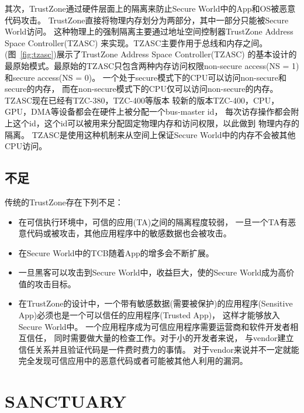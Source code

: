 其次，TrustZone通过硬件层面上的隔离来防止Secure World中的App和OS被恶意代码攻击\cite{trustZone-p5}。
TrustZone直接将物理内存划分为两部分，其中一部分只能被Secure World访问。
这种物理上的强制隔离主要通过地址空间控制器TrustZone Address Space Controller(TZASC)
来实现。TZASC主要作用于总线和内存之间。
(图~\ref{fig:tzasc})展示了TrustZone Address Space Controller(TZASC)\cite{trustZone-p3}
的基本设计的最原始模式。最原始的TZASC只包含两种内存访问权限non-secure access(NS = 1)
和secure access(NS = 0)。
一个处于secure模式下的CPU可以访问non-secure和secure的内存，
而在non-secure模式下的CPU仅可以访问non-secure的内存。
TZASC现在已经有TZC-380，TZC-400等版本\cite{trustZone-p3}
较新的版本TZC-400，CPU，GPU，DMA等设备都会在硬件上被分配一个bus-master id，
每次访存操作都会附上这个id，这个id可以被用来分配固定物理内存和访问权限，以此做到
物理内存的隔离。
TZASC是使用这种机制来从空间上保证Secure World中的内存不会被其他CPU访问\cite{sanctuary-p1}。



\subsection{不足}
传统的TrustZone存在下列不足：
\begin{itemize}
    \item
    在可信执行环境中，可信的应用(TA)之间的隔离程度较弱，
    一旦一个TA有恶意代码或被攻击，其他应用程序中的敏感数据也会被攻击\cite{trustZone-p6}。
    \item
    在Secure World中的TCB随着App的增多会不断扩展。
    \item 
    一旦黑客可以攻击到Secure World中，收益巨大，使的Secure World成为高价值的攻击目标\cite{sanctuary-p1}。
    \item
    在TrustZone的设计中，一个带有敏感数据(需要被保护)的应用程序(Sensitive App)必须也是一个可以信任的应用程序(Trusted App)，
    这样才能够放入Secure World中。
    一个应用程序成为可信应用程序需要运营商和软件开发者相互信任，
    同时需要做大量的检查工作。对于小的开发者来说，
    与vendor建立信任关系并且验证代码是一件费时费力的事情。
    对于vendor来说并不一定就能完全发现可信应用中的恶意代码或者可能被其他人利用的漏洞\cite{sanctuary-p1}。
\end{itemize}


\section{SANCTUARY}
